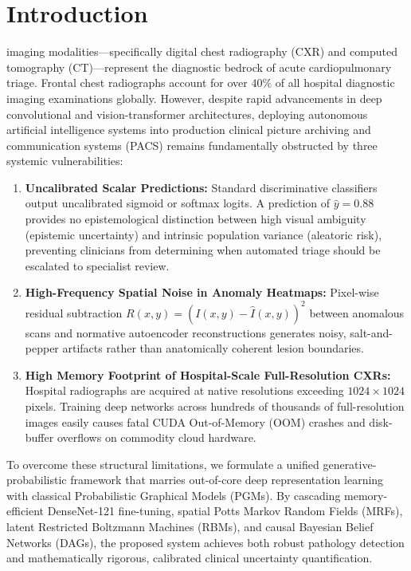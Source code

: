 \documentclass[conference]{IEEEtran}
\begin{document}
\section{Introduction}
 imaging modalities---specifically digital chest radiography (CXR) and computed tomography (CT)---represent the diagnostic bedrock of acute cardiopulmonary triage. Frontal chest radiographs account for over $40\%$ of all hospital diagnostic imaging examinations globally. However, despite rapid advancements in deep convolutional and vision-transformer architectures, deploying autonomous artificial intelligence systems into production clinical picture archiving and communication systems (PACS) remains fundamentally obstructed by three systemic vulnerabilities:

\begin{enumerate}
    \item \textbf{Uncalibrated Scalar Predictions:} Standard discriminative classifiers output uncalibrated sigmoid or softmax logits. A prediction of $\hat{y} = 0.88$ provides no epistemological distinction between high visual ambiguity (epistemic uncertainty) and intrinsic population variance (aleatoric risk), preventing clinicians from determining when automated triage should be escalated to specialist review.
    \item \textbf{High-Frequency Spatial Noise in Anomaly Heatmaps:} Pixel-wise residual subtraction $R(x, y) = (I(x, y) - \hat{I}(x, y))^2$ between anomalous scans and normative autoencoder reconstructions generates noisy, salt-and-pepper artifacts rather than anatomically coherent lesion boundaries.
    \item \textbf{High Memory Footprint of Hospital-Scale Full-Resolution CXRs:} Hospital radiographs are acquired at native resolutions exceeding $1024 \times 1024$ pixels. Training deep networks across hundreds of thousands of full-resolution images easily causes fatal CUDA Out-of-Memory (OOM) crashes and disk-buffer overflows on commodity cloud hardware.
\end{enumerate}

To overcome these structural limitations, we formulate a unified generative-probabilistic framework that marries out-of-core deep representation learning with classical Probabilistic Graphical Models (PGMs). By cascading memory-efficient DenseNet-121 fine-tuning, spatial Potts Markov Random Fields (MRFs), latent Restricted Boltzmann Machines (RBMs), and causal Bayesian Belief Networks (DAGs), the proposed system achieves both robust pathology detection and mathematically rigorous, calibrated clinical uncertainty quantification.
\end{document}
